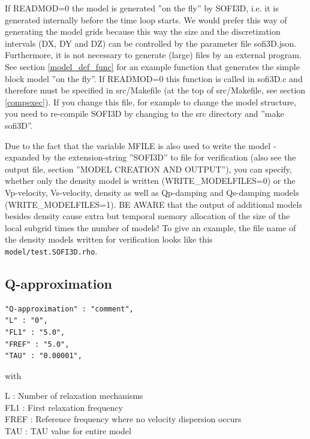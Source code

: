 \documentclass{hitec}
\begin{document}
If READMOD=0 the model is generated ''on the fly'' by SOFI3D, i.e. it is generated internally before the time loop starts. We would prefer this way of generating the model grids because this way the size and the discretization intervals (DX, DY and DZ) can be controlled by the parameter file sofi3D.json. Furthermore, it is not necessary to generate (large) files by an external program. See section \ref{model_def_func} for an example function that generates the simple block model ''on the fly''. If READMOD=0 this function is called in sofi3D.c and therefore must be specified in src/Makefile (at the top of src/Makefile, see section \ref{compexec}). If you change this file, for example to change the model structure, you need to re-compile SOFI3D by changing to the src directory and ''make sofi3D''.

Due to the fact that the variable MFILE is also used to write the model - expanded by the extension-string ''SOFI3D'' to file for verification (also see the output file, section ''MODEL CREATION AND OUTPUT''), you can specify, whether only the density model is written (WRITE\_MODELFILES=0) or the Vp-velocity, Vs-velocity, density as well as Qp-damping and Qs-damping models (WRITE\_MODELFILES=1). BE AWARE that the output of additional models besides density cause extra but temporal memory allocation of the size of the local subgrid times the number of models! To give an example, the file name of the density models written for verification looks like this  \lstinline{model/test.SOFI3D.rho}.

\subsection{Q-approximation}
\begin{verbatim}
"Q-approximation" : "comment",
"L" : "0",
"FL1" : "5.0", 
"FREF" : "5.0",
"TAU" : "0.00001",
\end{verbatim}

with

L : Number of relaxation mechanisms\\
FL1 : First relaxation frequency \\
FREF : Reference frequency where no velocity dispersion occurs \\
TAU : TAU value for entire model\\
\end{document}
